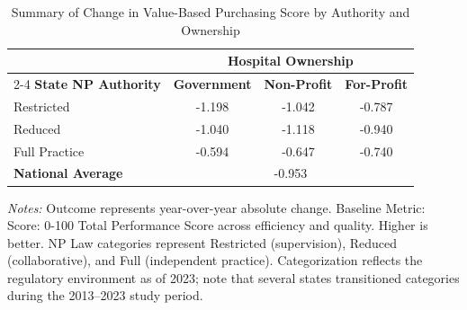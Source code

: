 \begin{table}[htbp]
    \centering
    \caption{Summary of Change in Value-Based Purchasing Score by Authority and Ownership}
    \label{tab:d_hvbp_tps_score}
    \vspace{0.2cm}
    \begin{tabular}{lccc}
        \toprule
        & \multicolumn{3}{c}{\textbf{Hospital Ownership}} \\
        \cmidrule(lr){2-4}
        \textbf{State NP Authority} & \textbf{Government} & \textbf{Non-Profit} & \textbf{For-Profit} \\
        \midrule
        Restricted & -1.198 & -1.042 & -0.787 \\
        Reduced & -1.040 & -1.118 & -0.940 \\
        Full Practice & -0.594 & -0.647 & -0.740 \\
        \midrule
        \textbf{National Average} & \multicolumn{3}{c}{-0.953} \\
        \bottomrule
    \end{tabular}
    \vspace{0.1cm}
    \begin{minipage}{0.85\textwidth}
        \footnotesize \textit{Notes:} Outcome represents year-over-year absolute change. Baseline Metric: Score: 0-100 Total Performance Score across efficiency and quality. Higher is better. NP Law categories represent Restricted (supervision), Reduced (collaborative), and Full (independent practice). Categorization reflects the regulatory environment as of 2023; note that several states transitioned categories during the 2013--2023 study period.
    \end{minipage}
\end{table}